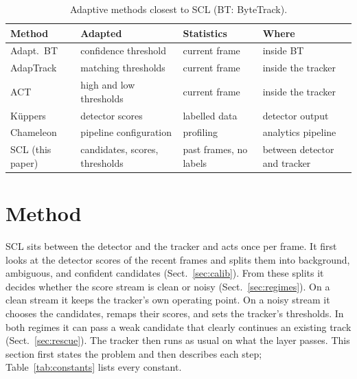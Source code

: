 \documentclass[pdflatex,sn-mathphys-num,iicol]{sn-jnl}
\newcommand{\scl}{SCL}
\begin{document}
\begin{table}[t]
\caption{Adaptive methods closest to \scl{} (BT: ByteTrack).}
\label{tab:related}
\centering\footnotesize
\setlength{\tabcolsep}{3pt}
\begin{tabular}{@{}>{\raggedright\arraybackslash}p{17mm}>{\raggedright\arraybackslash}p{18mm}>{\raggedright\arraybackslash}p{15mm}>{\raggedright\arraybackslash}p{18mm}@{}}
\toprule
Method & Adapted & Statistics & Where\\
\midrule
Adapt.\ BT \cite{ma2023adaptivebytetrack} & confidence threshold & current frame & inside BT\\
AdapTrack \cite{shim2024adaptrack} & matching thresholds & current frame & inside the tracker\\
ACT \cite{act2026adaptive} & high and low thresholds & current frame & inside the tracker\\
K{\"u}ppers \cite{kuppers2020detcalib} & detector scores & labelled data & detector output\\
Chameleon \cite{jiang2018chameleon} & pipeline configuration & profiling & analytics pipeline\\
\scl{} (this paper) & candidates, scores, thresholds & past frames, no labels & between detector and tracker\\
\bottomrule
\end{tabular}
\end{table}
\section{Method}\label{sec:method}

\scl{} sits between the detector and the tracker and acts once per frame. It
first looks at the detector scores of the recent frames and splits them into
background, ambiguous, and confident candidates (Sect.~\ref{sec:calib}). From
these splits it decides whether the score stream is clean or noisy
(Sect.~\ref{sec:regimes}). On a clean stream it keeps the tracker's own
operating point. On a noisy stream it chooses the candidates, remaps their
scores, and sets the tracker's thresholds. In both regimes it can pass a weak
candidate that clearly continues an existing track (Sect.~\ref{sec:rescue}).
The tracker then runs as usual on what the layer passes. This section first
states the problem and then describes each step; Table~\ref{tab:constants}
lists every constant.
\end{document}
